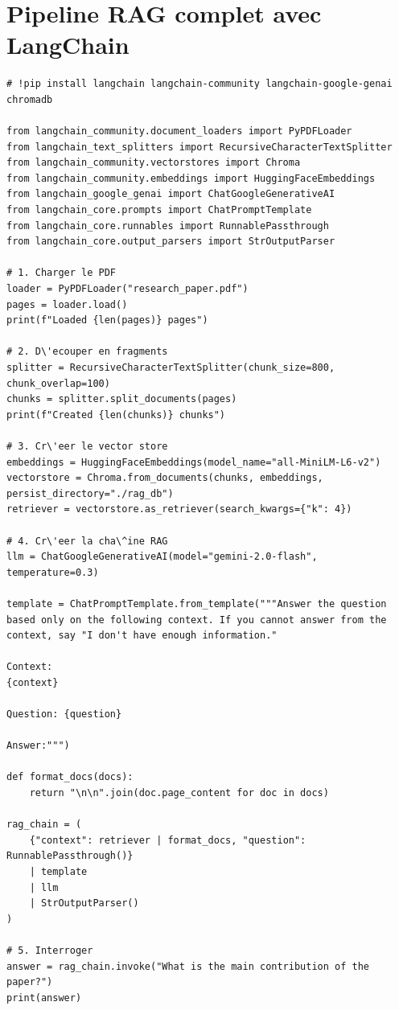 \section{Pipeline RAG complet avec LangChain}

\begin{verbatim}
# !pip install langchain langchain-community langchain-google-genai chromadb

from langchain_community.document_loaders import PyPDFLoader
from langchain_text_splitters import RecursiveCharacterTextSplitter
from langchain_community.vectorstores import Chroma
from langchain_community.embeddings import HuggingFaceEmbeddings
from langchain_google_genai import ChatGoogleGenerativeAI
from langchain_core.prompts import ChatPromptTemplate
from langchain_core.runnables import RunnablePassthrough
from langchain_core.output_parsers import StrOutputParser

# 1. Charger le PDF
loader = PyPDFLoader("research_paper.pdf")
pages = loader.load()
print(f"Loaded {len(pages)} pages")

# 2. D\'ecouper en fragments
splitter = RecursiveCharacterTextSplitter(chunk_size=800, chunk_overlap=100)
chunks = splitter.split_documents(pages)
print(f"Created {len(chunks)} chunks")

# 3. Cr\'eer le vector store
embeddings = HuggingFaceEmbeddings(model_name="all-MiniLM-L6-v2")
vectorstore = Chroma.from_documents(chunks, embeddings, persist_directory="./rag_db")
retriever = vectorstore.as_retriever(search_kwargs={"k": 4})

# 4. Cr\'eer la cha\^ine RAG
llm = ChatGoogleGenerativeAI(model="gemini-2.0-flash", temperature=0.3)

template = ChatPromptTemplate.from_template("""Answer the question based only on the following context. If you cannot answer from the context, say "I don't have enough information."

Context:
{context}

Question: {question}

Answer:""")

def format_docs(docs):
    return "\n\n".join(doc.page_content for doc in docs)

rag_chain = (
    {"context": retriever | format_docs, "question": RunnablePassthrough()}
    | template
    | llm
    | StrOutputParser()
)

# 5. Interroger
answer = rag_chain.invoke("What is the main contribution of the paper?")
print(answer)
\end{verbatim}


